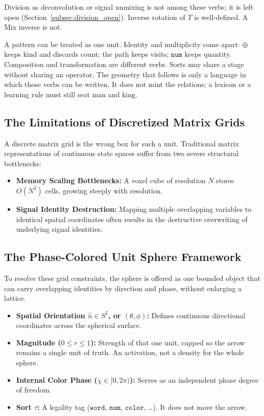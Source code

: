 \documentclass[12pt, a4paper]{article}
\begin{document}
Division as deconvolution or signal unmixing is not among these
verbs; it is left open
(Section~\ref{subsec:division_open}).
Inverse rotation of $T$ is well-defined. A Mix inverse is not.

A pattern can be treated as one unit. Identity and multiplicity come
apart: $\oplus$ keeps kind and discards count; the path keeps visits;
$\mathtt{num}$ keeps quantity. Composition and transformation are
different verbs. Sorts may share a stage without sharing an operator.
The geometry that follows is only a language in which those verbs can
be written. It does not mint the relations; a lexicon or a learning
rule must still seat $\mathrm{man}$ and $\mathrm{king}$.

\subsection{The Limitations of Discretized Matrix Grids}
A discrete matrix grid is the wrong box for such a unit. Traditional matrix representations of continuous state spaces suffer from two severe structural bottlenecks:
\begin{itemize}
    \item \textbf{Memory Scaling Bottlenecks:} A voxel cube of resolution $N$ stores $O(N^3)$ cells, growing steeply with resolution.
    \item \textbf{Signal Identity Destruction:} Mapping multiple overlapping variables to identical spatial coordinates often results in the destructive overwriting of underlying signal identities.
\end{itemize}

\subsection{The Phase-Colored Unit Sphere Framework}
To resolve these grid constraints, the sphere is offered as one bounded object that can carry overlapping identities by direction and phase, without enlarging a lattice.
\begin{itemize}
    \item \textbf{Spatial Orientation $\hat n \in S^2$, or $(\theta, \phi)$:} Defines continuous directional coordinates across the spherical surface.
    \item \textbf{Magnitude ($0 \leq r \leq 1$):} Strength of that one unit, capped so the arrow remains a single unit of truth. An activation, not a density for the whole sphere.
    \item \textbf{Internal Color Phase ($\chi \in [0, 2\pi)$):} Serves as an independent phase degree of freedom.
    \item \textbf{Sort $\tau$:} A legality tag ($\mathtt{word}$, $\mathtt{num}$, $\mathtt{color}$, \ldots). It does not move the arrow.
\end{itemize}
\end{document}
